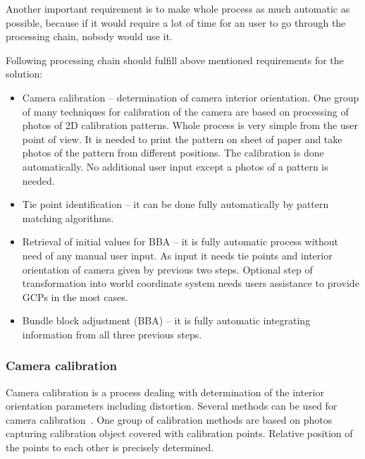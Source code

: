 \documentclass[a4paper,12pt]{article}
\begin{document}
Another important requirement is to make whole process as much automatic as possible, 
because if it would require a lot of time for an user to go through the processing chain, nobody would use it.

Following processing chain  \cite{labe2006automatic} should fulfill above mentioned requirements for the solution:

\begin{itemize}
\item Camera calibration -- determination of camera interior orientation.  One group of many techniques for calibration
of the camera are based on processing of photos of 2D calibration patterns. Whole process is very simple from the user point of view. It is needed 
to print the pattern on sheet of paper and take photos of the pattern from different positions. The calibration 
is done automatically. No additional user input except a photos of a pattern is needed.
\item Tie point identification -- it can be done fully automatically by pattern matching algorithms.
\item Retrieval of initial values for BBA -- it is fully automatic process without need of any manual user input.
As input it needs tie points and interior orientation of camera given by previous two steps.
 Optional step of transformation into world coordinate system needs users assistance
 to provide GCPs \cite{heipke1997automation} in the most cases.
\item Bundle block adjustment (BBA) -- it is fully automatic integrating information from all three previous steps.
\end{itemize}
 
\subsubsection{Camera calibration}
\label{sec:cam_calib}


Camera calibration is a process dealing with determination of the interior orientation parameters including distortion.
Several methods can be used for camera calibration~\cite{zhang2004calibration}. 
One group of calibration methods are based on photos capturing calibration object covered with calibration points.
Relative position of the points to each other is  precisely determined.  
\end{document}

